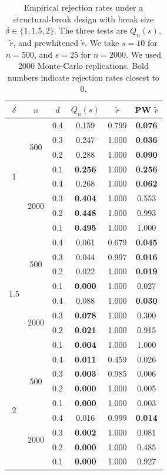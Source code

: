 \documentclass[10pt,a4paper]{amsart}
\numberwithin{equation}{section}
\begin{document}
\begin{table}[H]
\centering
\caption{Empirical rejection rates under a structural-break design with break size $\delta \in \{1,1.5,2\}$. The three tests are $Q_n(s)$, $\tilde r$, and prewhitened $\tilde r$.  We take $s=10$ for $n=500$,   and $s=25$ for $n=2000$. We used 2000 Monte-Carlo replications. Bold numbers indicate rejection rates closest to $0$.}
\label{tab:three_tests_break}
\begin{tabular}{cccccc}
\hline
$\delta$ & $n$ & $d$ & $Q_n(s)$ & $\tilde r$ & PW $\tilde r$\\
\hline
\multirow{8}{*}{1} & \multirow{4}{*}{500} & 0.4 & 0.159 & 0.799 & \textbf{0.076} \\
 &  & 0.3 & 0.247 & 1.000 & \textbf{0.036} \\
 &  & 0.2 & 0.288 & 1.000 & \textbf{0.090} \\
 &  & 0.1 & \textbf{0.256} & 1.000 & \textbf{0.256} \\
\cline{2-6}
 & \multirow{4}{*}{2000} & 0.4 & 0.268 & 1.000 & \textbf{0.062} \\
 &  & 0.3 & \textbf{0.404} & 1.000 & 0.553 \\
 &  & 0.2 & \textbf{0.448} & 1.000 & 0.993 \\
 &  & 0.1 & \textbf{0.495} & 1.000 & 1.000 \\
\hline
\multirow{8}{*}{1.5} & \multirow{4}{*}{500} & 0.4 & 0.061 & 0.679 & \textbf{0.045} \\
 &  & 0.3 & 0.044 & 0.997 & \textbf{0.016} \\
 &  & 0.2 & 0.022 & 1.000 & \textbf{0.019} \\
 &  & 0.1 & \textbf{0.000} & 1.000 & 0.027 \\
\cline{2-6}
 & \multirow{4}{*}{2000} & 0.4 & 0.088 & 1.000 & \textbf{0.030} \\
 &  & 0.3 & \textbf{0.078} & 1.000 & 0.300 \\
 &  & 0.2 & \textbf{0.021} & 1.000 & 0.915 \\
 &  & 0.1 & \textbf{0.004} & 1.000 & 1.000 \\
\hline
\multirow{8}{*}{2} & \multirow{4}{*}{500} & 0.4 & \textbf{0.011} & 0.459 & 0.026 \\
 &  & 0.3 & \textbf{0.003} & 0.985 & 0.006 \\
 &  & 0.2 & \textbf{0.000} & 1.000 & 0.005 \\
 &  & 0.1 & \textbf{0.000} & 1.000 & 0.003 \\
\cline{2-6}
 & \multirow{4}{*}{2000} & 0.4 & 0.016 & 0.999 & \textbf{0.014} \\
 &  & 0.3 & \textbf{0.002} & 1.000 & 0.081 \\
 &  & 0.2 & \textbf{0.000} & 1.000 & 0.485 \\
 &  & 0.1 & \textbf{0.000} & 1.000 & 0.927 \\
\hline
\end{tabular}
\end{table}
\clearpage
\end{document}
